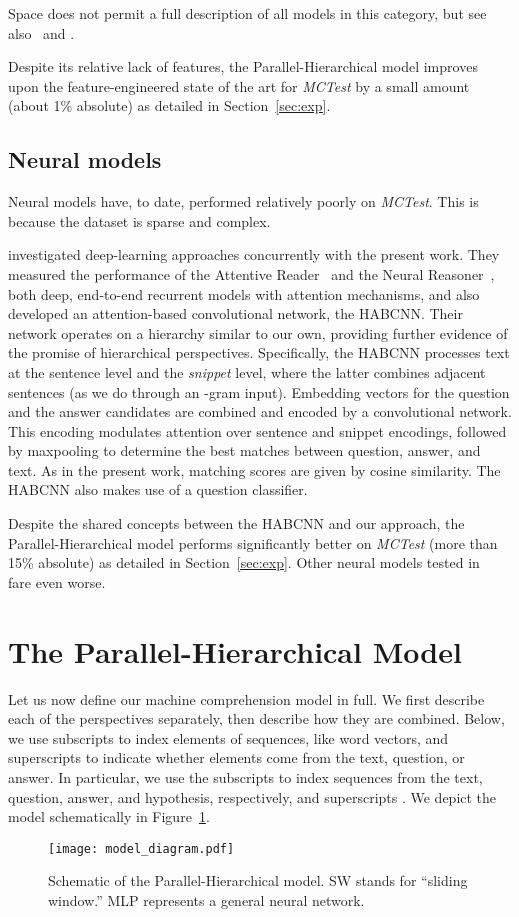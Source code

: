 \documentclass[11pt]{article}
\begin{document}
Space does not permit a full description of all models in this category, but see also~ and .

Despite its relative lack of features, the Parallel-Hierarchical model improves upon the feature-engineered state of the art for {\it MCTest} by a small amount (about 1\% absolute) as detailed in Section~\ref{sec:exp}.

\subsection{Neural models}
Neural models have, to date, performed relatively poorly on {\it MCTest}. This is because the dataset is sparse and complex.

 investigated deep-learning approaches concurrently with the present work. They measured the performance of the Attentive Reader~\cite{hermann2015} and the Neural Reasoner~\cite{peng2015}, both deep, end-to-end recurrent models with attention mechanisms, and also developed an attention-based convolutional network, the HABCNN. Their network operates on a hierarchy similar to our own, providing further evidence of the promise of hierarchical perspectives. Specifically, the HABCNN processes text at the sentence level and the \textsl{snippet} level, where the latter combines adjacent sentences (as we do through an -gram input). Embedding vectors for the question and the answer candidates are combined and encoded by a convolutional network. This encoding modulates attention over sentence and snippet encodings, followed by maxpooling to determine the best matches between question, answer, and text. As in the present work, matching scores are given by cosine similarity. The HABCNN also makes use of a question classifier.

Despite the shared concepts between the HABCNN and our approach, the Parallel-Hierarchical model performs significantly better on {\it MCTest} (more than 15\% absolute) as detailed in Section~\ref{sec:exp}. Other neural models tested in~ fare even worse.

\section{The Parallel-Hierarchical Model}
\label{sec:model}
Let us now define our machine comprehension model in full. We first describe each of the perspectives separately, then describe how they are combined. Below, we use subscripts to index elements of sequences, like word vectors, and superscripts to indicate whether elements come from the text, question, or answer. In particular, we use the subscripts  to index sequences from the text, question, answer, and hypothesis, respectively, and superscripts . We depict the model schematically in Figure~\ref{fig:model}.
\begin{figure}
	\centering
  	\texttt{[image: model\_diagram.pdf]}
  	\caption{ Schematic of the Parallel-Hierarchical model. SW stands for ``sliding window.'' MLP represents a general neural network.}
  	\label{fig:model}
\end{figure}
\end{document}
